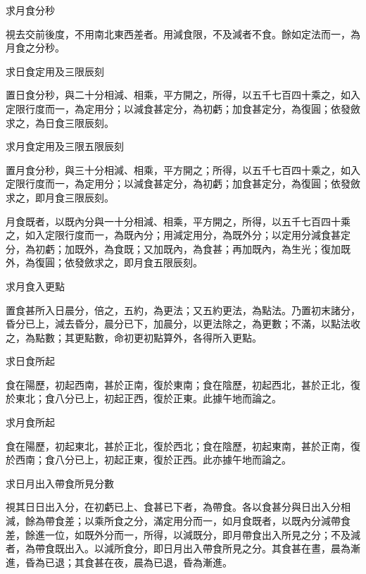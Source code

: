 \begin{pinyinscope}
 求月食分秒



 視去交前後度，不用南北東西差者。用減食限，不及減者不食。餘如定法而一，為月食之分秒。



 求日食定用及三限辰刻



 置日食分秒，與二十分相減、相乘，平方開之，所得，以五千七百四十乘之，如入定限行度而一，為定用分；以減食甚定分，為初虧；加食甚定分，為復圓；依發斂求之，為日食三限辰刻。



 求月食定用及三限五限辰刻



 置月食分秒，與三十分相減、相乘，平方開之；所得，以五千七百四十乘之，如入定限行度而一，為定用分；以減食甚定分，為初虧；加食甚定分，為復圓；依發斂求之，即月食三限辰刻。



 月食既者，以既內分與一十分相減、相乘，平方開之，所得，以五千七百四十乘之，如入定限行度而一，為既內分；用減定用分，為既外分；以定用分減食甚定分，為初虧；加既外，為食既；又加既內，為食甚；再加既內，為生光；復加既外，為復圓；依發斂求之，即月食五限辰刻。



 求月食入更點



 置食甚所入日晨分，倍之，五約，為更法；又五約更法，為點法。乃置初末諸分，昏分已上，減去昏分，晨分已下，加晨分，以更法除之，為更數；不滿，以點法收之，為點數；其更點數，命初更初點算外，各得所入更點。



 求日食所起



 食在陽歷，初起西南，甚於正南，復於東南；食在陰歷，初起西北，甚於正北，復於東北；食八分已上，初起正西，復於正東。此據午地而論之。



 求月食所起



 食在陽歷，初起東北，甚於正北，復於西北；食在陰歷，初起東南，甚於正南，復於西南；食八分已上，初起正東，復於正西。此亦據午地而論之。



 求日月出入帶食所見分數



 視其日日出入分，在初虧已上、食甚已下者，為帶食。各以食甚分與日出入分相減，餘為帶食差；以乘所食之分，滿定用分而一，如月食既者，以既內分減帶食差，餘進一位，如既外分而一，所得，以減既分，即月帶食出入所見之分；不及減者，為帶食既出入。以減所食分，即日月出入帶食所見之分。其食甚在晝，晨為漸進，昏為已退；其食甚在夜，晨為已退，昏為漸進。




\end{pinyinscope}
